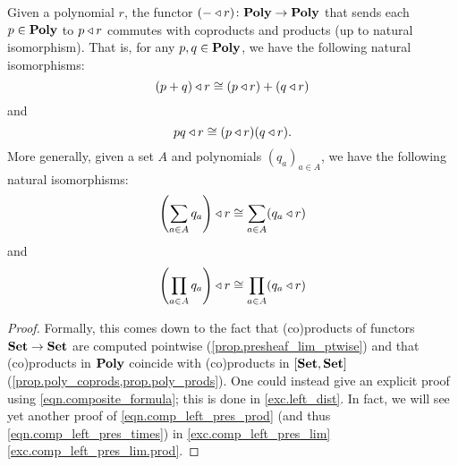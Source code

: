 \documentclass[Book-Poly]{subfiles}
\begin{document}
\begin{proposition}\label{prop.left_dist_prod}
Given a polynomial $r$, the functor $(-\mathbin{\triangleleft} r)\colon\mathbf{Poly}\to\mathbf{Poly}$ that sends each $p\in\mathbf{Poly}$ to $p\mathbin{\triangleleft} r$ commutes with coproducts and products (up to natural isomorphism).
That is, for any $p,q\in\mathbf{Poly}$, we have the following natural isomorphisms:
\begin{equation}\label{eqn.comp_left_pres_plus}
    (p+q)\mathbin{\triangleleft} r\cong (p\mathbin{\triangleleft} r)+(q\mathbin{\triangleleft} r)
\end{equation}
and
\begin{equation}\label{eqn.comp_left_pres_times}
    pq\mathbin{\triangleleft} r\cong (p\mathbin{\triangleleft} r)(q\mathbin{\triangleleft} r).
\end{equation}
More generally, given a set $A$ and polynomials $(q_a)_{a\in A}$, we have the following natural isomorphisms:
\begin{equation}\label{eqn.comp_left_pres_sum}
    \left(\sum_{a\in A}q_a\right)\mathbin{\triangleleft} r\cong \sum_{a\in A} (q_a\mathbin{\triangleleft} r)
\end{equation}
and
\begin{equation}\label{eqn.comp_left_pres_prod}
    \left(\prod_{a\in A}q_a\right)\mathbin{\triangleleft} r\cong \prod_{a\in A} (q_a\mathbin{\triangleleft} r)
\end{equation}
\end{proposition} 
\begin{proof}
Formally, this comes down to the fact that (co)products of functors $\mathbf{Set}\to\mathbf{Set}$ are computed pointwise (\cref{prop.presheaf_lim_ptwise}) and that (co)products in $\mathbf{Poly}$ coincide with (co)products in $[\mathbf{Set},\mathbf{Set}]$ (\cref{prop.poly_coprods,prop.poly_prods}).
One could instead give an explicit proof using \eqref{eqn.composite_formula}; this is done in \cref{exc.left_dist}.
In fact, we will see yet another proof of \eqref{eqn.comp_left_pres_prod} (and thus \eqref{eqn.comp_left_pres_times}) in \cref{exc.comp_left_pres_lim} \cref{exc.comp_left_pres_lim.prod}.
\end{proof}
\end{document}
